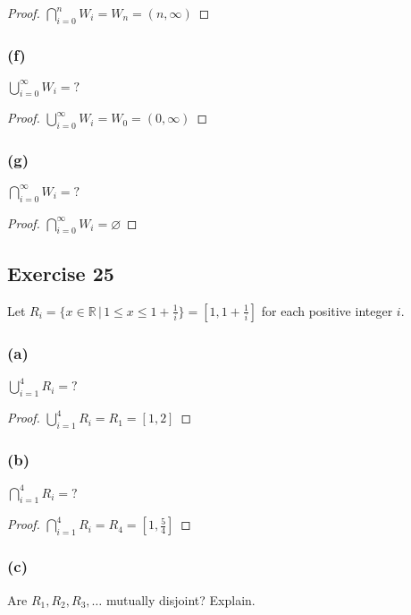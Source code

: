 \documentclass[14pt]{extarticle}
\newcommand{\es}{\varnothing}
\newcommand{\dps}{\displaystyle}
\newcommand{\R}{\mathbb{R}}
\begin{document}
\begin{proof}
  \(\dps \bigcap_{i=0}^{n}W_i = W_n = (n, \infty)\)
\end{proof}

\subsubsection{(f)}
\(\dps \bigcup_{i=0}^{\infty}W_i = ?\)

\begin{proof}
  \(\dps \bigcup_{i=0}^{\infty}W_i = W_0 = (0, \infty)\)
\end{proof}

\subsubsection{(g)}
\(\dps \bigcap_{i=0}^{\infty}W_i = ?\)

\begin{proof}
  \(\dps \bigcap_{i=0}^{\infty}W_i = \es\)
\end{proof}

\subsection{Exercise 25}
Let \(R_i = \{x \in \R \,|\, 1 \leq x \leq 1 + \frac{1}{i}\} = \left[1, 1 + \frac{1}{i}\right]\)
for each positive integer $i$.

\subsubsection{(a)}
\(\dps \bigcup_{i=1}^{4}R_i = ?\)

\begin{proof}
  \(\dps \bigcup_{i=1}^{4}R_i = R_1 = [1, 2]\)
\end{proof}

\subsubsection{(b)}
\(\dps \bigcap_{i=1}^{4}R_i = ?\)

\begin{proof}
  \(\dps \bigcap_{i=1}^{4}R_i = R_4 = \left[1, \frac{5}{4}\right]\)
\end{proof}

\subsubsection{(c)}
Are \(R_1, R_2, R_3, \ldots\) mutually disjoint? Explain.
\end{document}
